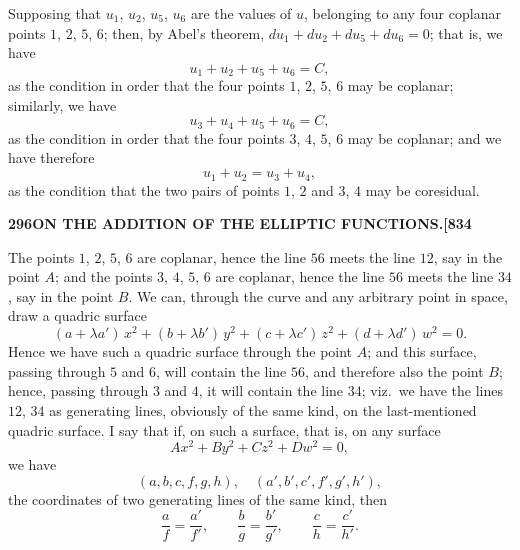 \documentclass[11pt]{article}
\begin{document}
Supposing that $u_{1}$, $u_{2}$, $u_{5}$, $u_{6}$ are the values of $u$, belonging to any four coplanar points $1$, $2$, $5$, $6$; then, by Abel's theorem, $du_{1} + du_{2} + du_{5} + du_{6} = 0$; that is, we have
\[
u_{1} + u_{2} + u_{5} + u_{6} = C,
\]
as the condition in order that the four points $1$, $2$, $5$, $6$ may be coplanar; similarly, we have
\[
u_{3} + u_{4} + u_{5} + u_{6} = C,
\]
as the condition in order that the four points $3$, $4$, $5$, $6$ may be coplanar; and we have therefore
\[
u_{1} + u_{2} = u_{3} + u_{4},
\]
as the condition that the two pairs of points $1$, $2$ and $3$, $4$ may be coresidual.

\newpage

\noindent\textbf{296}\hfill\textbf{ON THE ADDITION OF THE ELLIPTIC FUNCTIONS.}\hfill\textbf{[834}

\bigskip

\noindent The points $1$, $2$, $5$, $6$ are coplanar, hence the line $56$ meets the line $12$, say in the point $A$; and the points $3$, $4$, $5$, $6$ are coplanar, hence the line $56$ meets the line $34$, say in the point $B$. We can, through the curve and any arbitrary point in space, draw a quadric surface
\[
(a + \lambda a')\,x^{2} + (b + \lambda b')\,y^{2} + (c + \lambda c')\,z^{2} + (d + \lambda d')\,w^{2} = 0.
\]
Hence we have such a quadric surface through the point $A$; and this surface, passing through $5$ and $6$, will contain the line $56$, and therefore also the point $B$; hence, passing through $3$ and $4$, it will contain the line $34$; viz.\ we have the lines $12$, $34$ as generating lines, obviously of the same kind, on the last-mentioned quadric surface. I say that if, on such a surface, that is, on any surface
\[
Ax^{2} + By^{2} + Cz^{2} + Dw^{2} = 0,
\]
we have
\[
(a, b, c, f, g, h),\quad (a', b', c', f', g', h'),
\]
the coordinates of two generating lines of the same kind, then
\[
\frac{a}{f} = \frac{a'}{f'},\qquad \frac{b}{g} = \frac{b'}{g'},\qquad \frac{c}{h} = \frac{c'}{h'}.
\]

\medskip
\end{document}
